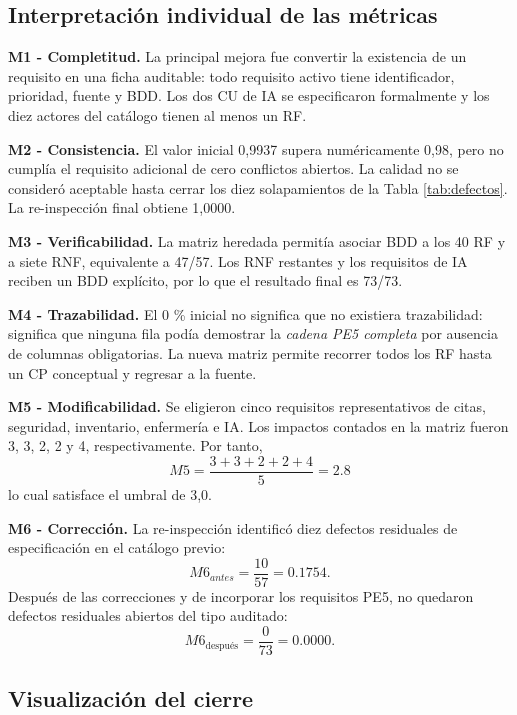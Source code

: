 \documentclass[11pt,a4paper]{article}
\begin{document}
	\subsection{Interpretación individual de las métricas}
	\textbf{M1 - Completitud.} La principal mejora fue convertir la existencia de un requisito en una ficha auditable: todo requisito activo tiene identificador, prioridad, fuente y BDD. Los dos CU de IA se especificaron formalmente y los diez actores del catálogo tienen al menos un RF.
	
	\textbf{M2 - Consistencia.} El valor inicial 0,9937 supera numéricamente 0,98, pero no cumplía el requisito adicional de cero conflictos abiertos. La calidad no se consideró aceptable hasta cerrar los diez solapamientos de la Tabla \ref{tab:defectos}. La re-inspección final obtiene 1,0000.
	
	\textbf{M3 - Verificabilidad.} La matriz heredada permitía asociar BDD a los 40 RF y a siete RNF, equivalente a 47/57. Los RNF restantes y los requisitos de IA reciben un BDD explícito, por lo que el resultado final es 73/73.
	
	\textbf{M4 - Trazabilidad.} El 0 \% inicial no significa que no existiera trazabilidad: significa que ninguna fila podía demostrar la \emph{cadena PE5 completa} por ausencia de columnas obligatorias. La nueva matriz permite recorrer todos los RF hasta un CP conceptual y regresar a la fuente.
	
	\textbf{M5 - Modificabilidad.} Se eligieron cinco requisitos representativos de citas, seguridad, inventario, enfermería e IA. Los impactos contados en la matriz fueron 3, 3, 2, 2 y 4, respectivamente. Por tanto, 
	\[M5=\frac{3+3+2+2+4}{5}=2.8\] 
	lo cual satisface el umbral de 3,0. 
	
	\textbf{M6 - Corrección.} La re-inspección identificó diez defectos residuales de especificación en el catálogo previo: 
	\[M6_{antes}=\frac{10}{57}=0.1754.\] 
	Después de las correcciones y de incorporar los requisitos PE5, no quedaron defectos residuales abiertos del tipo auditado: 
	\[M6_{\text{después}}=\frac{0}{73}=0.0000.\]

\subsection{Visualización del cierre}
	
\end{document}
